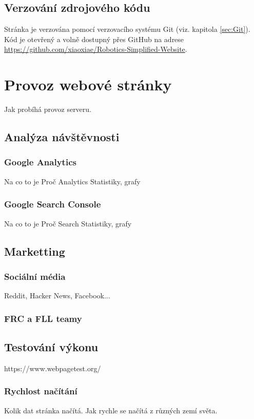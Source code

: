\documentclass[a4paper, 12pt]{article}
\begin{document}
  \subsection{Verzování zdrojového kódu}
  Stránka je verzována pomocí verzovacího systému Git (viz. kapitola \ref{sec:Git}). Kód je otevřený a volně dostupný přes GitHub na adrese \url{https://github.com/xiaoxiae/Robotics-Simplified-Website}.


  \section{Provoz webové stránky}
  Jak probíhá provoz serveru.

  \subsection{Analýza návštěvnosti}

  \subsubsection{Google Analytics}
  Na co to je
  Proč Analytics
  Statistiky, grafy

  \subsubsection{Google Search Console}
  Na co to je
  Proč Search
  Statistiky, grafy

  \subsection{Marketting}

  \subsubsection{Sociální média}
  Reddit, Hacker News, Facebook...

  \subsubsection{FRC a FLL teamy}

  \subsection{Testování výkonu}
  https://www.webpagetest.org/

  \subsubsection{Rychlost načítání}
  Kolik dat stránka načítá.
  Jak rychle se načítá z různých zemí světa.
\end{document}
